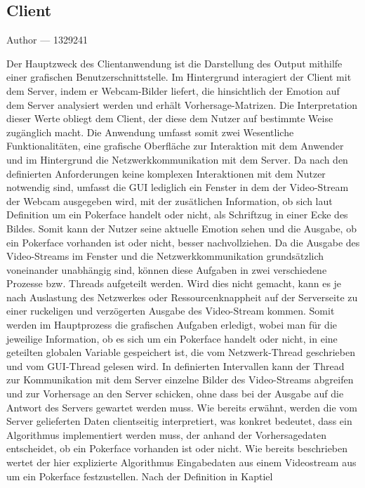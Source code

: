 \documentclass[12pt, a4paper]{report}
\makeatletter
\newcommand{\sectionauthor}[1]{%
  {\parindent0pt\vspace*{-5pt}%
  \large{Author --- }
  \linespread{1.1}\large\scshape#1%
  \par\nobreak\vspace*{35pt} }
  \@afterheading%
}
\makeatother
\begin{document}
\subsection{Client}
\sectionauthor{1329241}
Der Hauptzweck des Clientanwendung ist die Darstellung des Output mithilfe einer grafischen Benutzerschnittstelle. Im Hintergrund interagiert der Client mit dem Server, indem er Webcam-Bilder liefert, die hinsichtlich der Emotion auf dem Server analysiert werden und erhält Vorhersage-Matrizen. Die Interpretation dieser Werte obliegt dem Client, der diese dem Nutzer auf bestimmte Weise zugänglich macht. Die Anwendung umfasst somit zwei Wesentliche Funktionalitäten, eine grafische Oberfläche zur Interaktion mit dem Anwender und im Hintergrund die Netzwerkkommunikation mit dem Server. Da nach den definierten Anforderungen keine komplexen Interaktionen mit dem Nutzer notwendig sind, umfasst die GUI lediglich ein Fenster in dem der Video-Stream der Webcam ausgegeben wird, mit der zusätlichen Information, ob sich laut Definition um ein Pokerface handelt oder nicht, als Schriftzug in einer Ecke des Bildes. Somit kann der Nutzer seine aktuelle Emotion sehen und die Ausgabe, ob ein Pokerface vorhanden ist oder nicht, besser nachvollziehen. Da die Ausgabe des Video-Streams im Fenster und die Netzwerkkommunikation grundsätzlich voneinander unabhängig sind, können diese Aufgaben in zwei verschiedene Prozesse bzw. Threads aufgeteilt werden. Wird dies nicht gemacht, kann es je nach Auslastung des Netzwerkes oder Ressourcenknappheit auf der Serverseite zu einer ruckeligen und verzögerten Ausgabe des Video-Stream kommen. Somit werden im Hauptprozess die grafischen Aufgaben erledigt, wobei man für die jeweilige Information, ob es sich um ein Pokerface handelt oder nicht, in eine geteilten globalen Variable gespeichert ist, die vom Netzwerk-Thread geschrieben und vom GUI-Thread gelesen wird. In definierten Intervallen kann der Thread zur Kommunikation mit dem Server einzelne Bilder des Video-Streams abgreifen und zur Vorhersage an den Server schicken, ohne dass bei der Ausgabe auf die Antwort des Servers gewartet werden muss. Wie bereits erwähnt, werden die vom Server gelieferten Daten clientseitig interpretiert, was konkret bedeutet, dass ein Algorithmus implementiert werden muss, der anhand der Vorhersagedaten entscheidet, ob ein Pokerface vorhanden ist oder nicht. \newline
Wie bereits beschrieben wertet der hier explizierte Algorithmus Eingabedaten aus einem Videostream aus um ein Pokerface festzustellen. Nach der Definition in Kaptiel 
\end{document}
